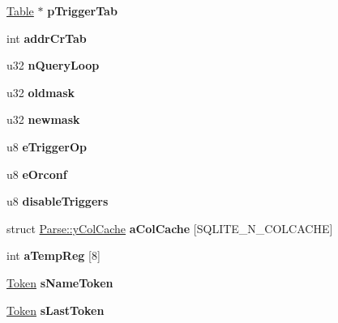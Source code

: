 \begin{DoxyCompactItemize}
\mbox{\hyperlink{struct_table}{Table}} $\ast$ {\bfseries p\+Trigger\+Tab}
\item 
\mbox{\label{struct_parse_a4ca16d26d451cd965dbb81906f9c6b0e}} 
int {\bfseries addr\+Cr\+Tab}
\item 
\mbox{\label{struct_parse_ae85aa19104aeeab3cc7241bfd8b5d553}} 
u32 {\bfseries n\+Query\+Loop}
\item 
\mbox{\label{struct_parse_acda3334b932ac6541f45fa939053e942}} 
u32 {\bfseries oldmask}
\item 
\mbox{\label{struct_parse_a698d9e9d4938cc35a4ef9137a46f1840}} 
u32 {\bfseries newmask}
\item 
\mbox{\label{struct_parse_addd3028173ab100a8802dfcc9b13ffb7}} 
u8 {\bfseries e\+Trigger\+Op}
\item 
\mbox{\label{struct_parse_a67083fd2286b7d5276831e84a1a16680}} 
u8 {\bfseries e\+Orconf}
\item 
\mbox{\label{struct_parse_a5ea9b658f4cfacf4b35f18c51e144ef1}} 
u8 {\bfseries disable\+Triggers}
\item 
\mbox{\label{struct_parse_a788b85979d58b84e06bc367bac5b3f3f}} 
struct \mbox{\hyperlink{struct_parse_1_1y_col_cache}{Parse\+::y\+Col\+Cache}} {\bfseries a\+Col\+Cache} \mbox{[}S\+Q\+L\+I\+T\+E\+\_\+\+N\+\_\+\+C\+O\+L\+C\+A\+C\+HE\mbox{]}
\item 
\mbox{\label{struct_parse_ae2bd2e74d0caaab7a741d17b62f01ebc}} 
int {\bfseries a\+Temp\+Reg} \mbox{[}8\mbox{]}
\item 
\mbox{\label{struct_parse_afd929c54566cfc4d6f748fcc6b79b973}} 
\mbox{\hyperlink{struct_token}{Token}} {\bfseries s\+Name\+Token}
\item 
\mbox{\label{struct_parse_ad499020d1bf06f3c98c8d36e2ceb83fd}} 
\mbox{\hyperlink{struct_token}{Token}} {\bfseries s\+Last\+Token}
\item 
\mbox{\label{struct_parse_ae529f84d792c36e3f474e2ff89f0b6e4}} 

\end{DoxyCompactItemize}
